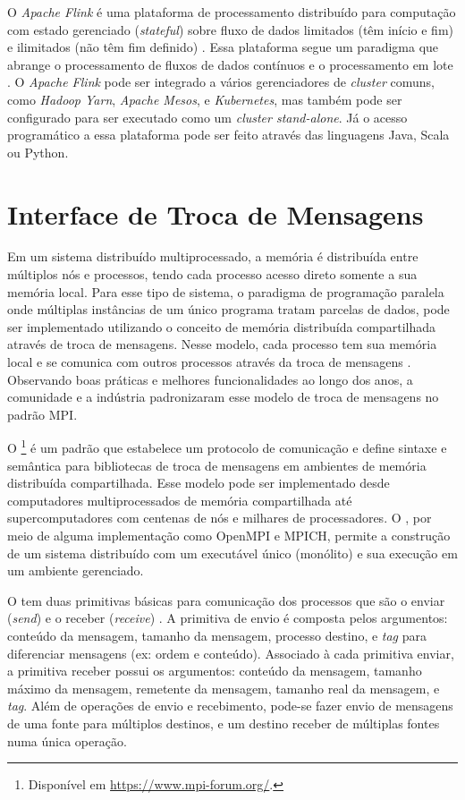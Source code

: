 O \emph{Apache Flink} é uma plataforma de processamento distribuído para
computação com estado gerenciado (\emph{stateful}) sobre fluxo de dados limitados (têm início e
fim) e ilimitados (não têm fim definido) \cite{ApacheFlink2020}.
Essa plataforma segue um paradigma que abrange o processamento de fluxos de
dados contínuos e o processamento em lote \cite{Carbone2015,Lopez2018}.
O \emph{Apache Flink} pode ser integrado a vários gerenciadores de \emph{cluster}
comuns, como \emph{Hadoop Yarn}, \emph{Apache Mesos}, e \emph{Kubernetes}, mas também pode ser
configurado para ser executado como um \emph{cluster stand-alone}.
Já o acesso programático a essa plataforma pode ser feito através das linguagens
Java, Scala ou Python.

\section{Interface de Troca de Mensagens}

Em um sistema distribuído multiprocessado, a memória é distribuída entre
múltiplos nós e processos, tendo cada processo acesso direto somente a sua memória
local.
Para esse tipo de sistema, o paradigma de programação paralela \spmd onde
múltiplas instâncias de um único programa tratam parcelas de dados, pode ser
implementado utilizando o conceito de memória distribuída compartilhada através
de troca de mensagens.
Nesse modelo, cada
processo tem sua memória local e se comunica com outros processos através da
troca de mensagens \cite{mpi-book}.
Observando boas práticas e melhores funcionalidades ao longo dos anos, a
comunidade e a indústria padronizaram esse modelo de troca de mensagens no
padrão \acf{MPI}.

O \mpi\footnote{Disponível em \url{https://www.mpi-forum.org/}.} é um padrão que
estabelece um protocolo de comunicação e define sintaxe e semântica para
bibliotecas de troca de mensagens em ambientes de memória distribuída compartilhada.
Esse modelo pode ser implementado desde computadores multiprocessados de memória
compartilhada até supercomputadores com centenas de nós e milhares de
processadores.
O \mpi, por meio de alguma
implementação como OpenMPI e MPICH, permite a construção de um sistema
distribuído com um executável único (monólito) e sua execução em um ambiente gerenciado.

O \mpi tem duas primitivas básicas para comunicação dos processos que são o
enviar (\emph{send}) e o receber (\emph{receive}) \cite{mpi-book}. A primitiva de
envio é composta pelos argumentos: conteúdo da mensagem, tamanho da mensagem,
processo destino, e \emph{tag} para diferenciar mensagens (ex: ordem e conteúdo).
Associado à cada primitiva enviar, a primitiva receber possui os argumentos:
conteúdo da mensagem, tamanho máximo da mensagem, remetente da mensagem, tamanho
real da mensagem, e \emph{tag}.
Além de operações de envio e recebimento, pode-se fazer
envio de mensagens de uma fonte para múltiplos destinos, e um destino receber de
múltiplas fontes numa única operação.

